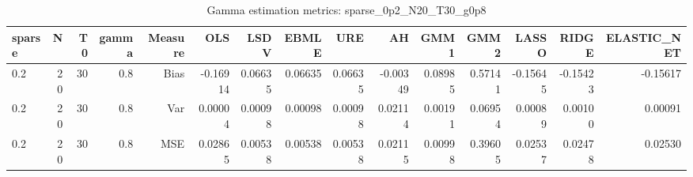 \begin{table}[!htbp]\centering
\caption{Gamma estimation metrics: sparse_0p2_N20_T30_g0p8}
\label{tab:table1_sparse_0p2_N20_T30_g0p8}
\begin{tabular}{lrrrrrrrrrrrrrr}
\hline
sparse & N & T0 & gamma & Measure & OLS & LSDV & EBMLE & URE & AH & GMM1 & GMM2 & LASSO & RIDGE & ELASTIC_NET \\
\hline
0.2 & 20 & 30 & 0.8 & Bias & -0.16914 & 0.06635 & 0.06635 & 0.06635 & -0.00349 & 0.08985 & 0.57141 & -0.15645 & -0.15423 & -0.15617 \\
0.2 & 20 & 30 & 0.8 & Var & 0.00004 & 0.00098 & 0.00098 & 0.00098 & 0.02114 & 0.00191 & 0.06954 & 0.00089 & 0.00100 & 0.00091 \\
0.2 & 20 & 30 & 0.8 & MSE & 0.02865 & 0.00538 & 0.00538 & 0.00538 & 0.02115 & 0.00998 & 0.39605 & 0.02537 & 0.02478 & 0.02530 \\
\hline
\end{tabular}
\end{table}

